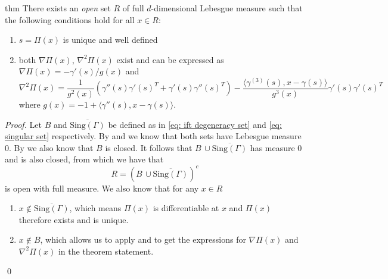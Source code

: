 \documentclass[11pt]{article}
\begin{document}
\begin{restatable}[Differentiability of $\Pi$]{thm}{} \label{thm: differentiability of pi}
    There exists an \textit{open} set $R$ of full $d$-dimensional Lebesgue measure such that the following conditions hold for all $x \in R$:
    \begin{enumerate}
        \item $s = \Pi(x)$ is unique and well defined
        \item both $\nabla\Pi(x)$, $\nabla^2\Pi(x)$ exist and can be expressed as $\nabla\Pi(x)  = -\gamma'(s)/g(x)$ and 
        \begin{equation}
            \nabla^2\Pi(x) = \frac{1}{g^2(x)}\left(\gamma''(s)\gamma'(s)^T + \gamma'(s)\gamma''(s)^T\right)- \frac{\langle\gamma^{(3)}(s), x - \gamma(s)\rangle}{g^3(x)}\gamma'(s)\gamma'(s)^T
        \end{equation}
        where $g(x) = -1 + \langle\gamma''(s), x-\gamma(s)\rangle$. 
    \end{enumerate}
\end{restatable}
\noindent \textit{Proof.} Let $B$ and $\overline{\text{Sing}(\Gamma)}$ be defined as in \cref{eq: ift degeneracy set} and \cref{eq: singular set} respectively. By  and  we know that both sets have Lebesgue measure $0$. By  we also know that $B$ is closed. It follows that $B \, \cup \overline{\text{Sing}(\Gamma)}$ has measure $0$ and is also closed, from which we have that 
\begin{equation}
    R = \left(B \, \cup \overline{\text{Sing}(\Gamma)}\right)^c \label{eq: good set}
\end{equation}
is open with full measure. We also know that for any $x \in R$
\begin{enumerate}
    \item $x \notin \overline{\text{Sing}(\Gamma)}$, which means $\Pi(x)$ is differentiable at $x$ and $\Pi(x)$ therefore exists and is unique. 
    \item $x \notin B$, which allows us to apply  and  to get the expressions for $\nabla\Pi(x)$ and $\nabla^2\Pi(x)$ in the theorem statement.
\end{enumerate}
\qed{}

\end{document}
